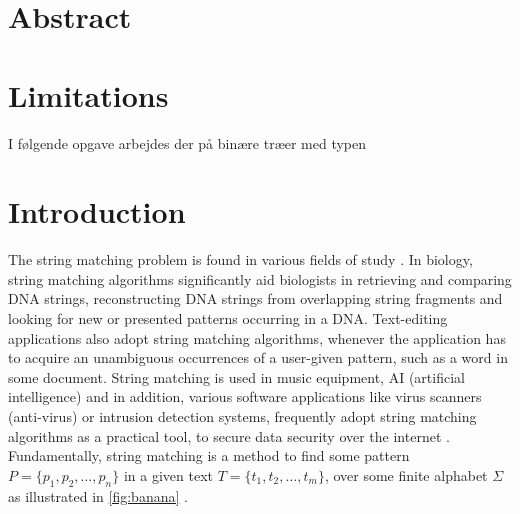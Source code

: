 \documentclass[12pt]{article} %
\begin{document}






\newpage %
\tableofcontents
\newpage





\section{Abstract}

\section{Limitations}

I følgende opgave arbejdes der på binære træer med typen 

\section{Introduction}

The string matching problem is found in various fields of study \cite{mit}. In biology, string matching algorithms significantly aid biologists in retrieving and comparing DNA strings, reconstructing DNA strings from overlapping string fragments and looking for new or presented patterns occurring in a DNA\cite{gusfield}. Text-editing applications also adopt string matching algorithms, whenever the application has to acquire an unambiguous occurrences of a user-given pattern, such as a word in some document\cite{introduction, gusfield}. String matching is used in music equipment, AI (artificial intelligence) and in addition, various software applications like virus scanners (anti-virus) or intrusion detection systems, frequently adopt string matching algorithms as a practical tool, to secure data security over the internet \cite{detection}.
Fundamentally, string matching is a method to find some pattern $P =\{p_1,p_2,…,p_n\}$ in a given text $T=\{t_1, t_2,…,t_m\}$, over some finite alphabet $\Sigma$ as illustrated in \cref{fig:banana} \cite{detection}.
\end{document}
